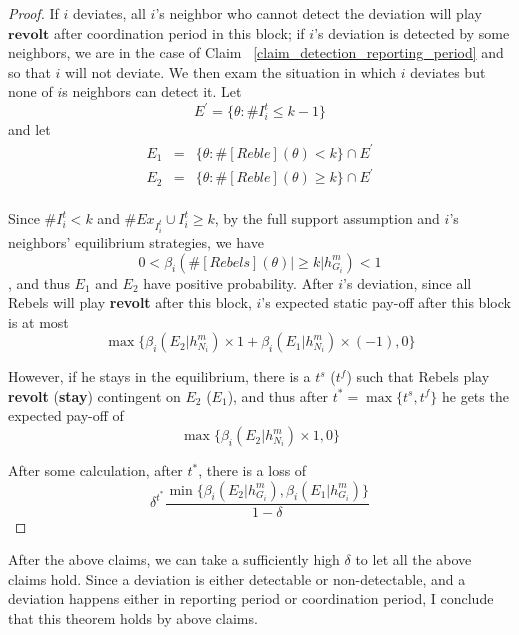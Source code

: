 \documentclass[12pt,letterpaper]{article}
\newtheorem*{main result}{Main Result}
\theoremstyle{definition}
\theoremstyle{remark}
\theoremstyle{claim}
\begin{document}
\begin{proof}


If $i$ deviates, all $i$'s neighbor who cannot detect the deviation will play $\textbf{revolt}$ after coordination period in this block; if $i$'s deviation is detected by some neighbors, we are in the case of Claim ~\ref{claim_detection_reporting_period} and so that $i$ will not deviate. We then exam the situation in which $i$ deviates but none of $i$s neighbors can detect it.
Let 
\[E^{'}=\{\theta:\#I^{t}_i\leq k-1\}\]
and let 
\begin{eqnarray*}
E_1&=&\{\theta: \#[Reble](\theta)<k\}\cap E^{'}\\
E_2&=&\{\theta: \#[Reble](\theta)\geq k\}\cap E^{'}\\
\end{eqnarray*}

Since $\# I^t_i<k$ and $\# Ex_{I^{t}_i}\cup I^{t}_i \geq k$, by the full support assumption and $i$'s neighbors' equilibrium strategies, we have 
\[0<\beta_{i}(\#[Rebels](\theta)|\geq k|h^{m}_{G_i})<1\], and thus $E_1$ and $E_2$ have positive probability. After $i$'s deviation, since all Rebels will play \textbf{revolt} after this block, $i$'s expected static pay-off after this block is at most 
\[
{\max\{\beta_{i}(E_2|h^{m}_{N_i})\times 1+\beta_{i}(E_1|h^{m}_{N_i})\times (-1), 0\}}
\]

However, if he stays in the equilibrium, there is a $t^s$ ($t^f$) such that Rebels play \textbf{revolt} (\textbf{stay}) contingent on $E_2$ ($E_1$), and thus after $t^*=\max\{t^s,t^f\}$ he gets the expected pay-off of
\[
{\max\{\beta_{i}(E_2|h^{m}_{N_i})\times 1, 0\}}
\]

After some calculation, after $t^*$, there is a loss of
\[\delta^{t^{*}}\frac{\min\{\beta_{i}(E_2|h^{m}_{G_i}),\beta_{i}(E_1|h^{m}_{G_i})\}}{1-\delta}\]

\end{proof}

After the above claims, we can take a sufficiently high $\delta$ to let all the above claims hold. Since a deviation is either detectable or non-detectable, and a deviation happens either in reporting period or coordination period, I conclude that this theorem holds by above claims. 
\end{document}
